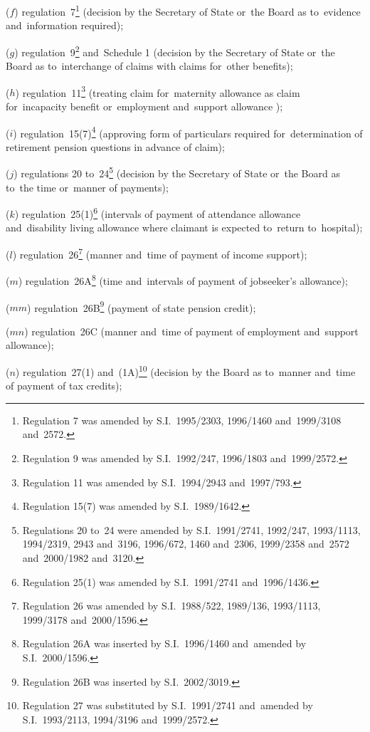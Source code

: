\documentclass[12pt,a4paper]{article}
\begin{document}
\begin{enumerate}
($f$) regulation~7\footnote{Regulation 7 was amended by S.I.~1995/2303, 1996/1460 and~1999/3108 and~2572.} (decision by the Secretary of State or~the Board as to~evidence and~information required);

($g$) regulation~9\footnote{Regulation 9 was amended by S.I.~1992/247, 1996/1803 and~1999/2572.} and~Schedule 1 (decision by the Secretary of State or~the Board as to~interchange of claims with claims for~other benefits);

($h$) regulation~11\footnote{Regulation 11 was amended by S.I.~1994/2943 and~1997/793.} (treating claim for~maternity allowance as claim for~incapacity benefit
or~employment and~support allowance%
);

($i$) regulation~15(7)\footnote{Regulation 15(7) was amended by S.I.~1989/1642.} (approving form of particulars required for~determination of retirement pension questions in advance of claim);

($j$) regulations 20 to~24\footnote{Regulations 20 to~24 were amended by S.I.~1991/2741, 1992/247, 1993/1113, 1994/2319, 2943 and~3196, 1996/672, 1460 and~2306, 1999/2358 and~2572 and~2000/1982 and~3120.} (decision by the Secretary of State or~the Board as to~the time or~manner of payments);

($k$) regulation~25(1)\footnote{Regulation 25(1) was amended by S.I.~1991/2741 and~1996/1436.} (intervals of payment of attendance allowance and~disability living allowance where claimant is expected to~return to~hospital);

($l$) regulation~26\footnote{Regulation 26 was amended by S.I.~1988/522, 1989/136, 1993/1113, 1999/3178 and~2000/1596.} (manner and~time of payment of income support);

($m$) regulation~26A\footnote{Regulation 26A was inserted by S.I.~1996/1460 and~amended by S.I.~2000/1596.} (time and~intervals of payment of jobseeker’s allowance);

($mm$) regulation~26B\footnote{Regulation 26B was inserted by S.I.~2002/3019.} (payment of state pension credit);

($mn$) regulation~26C (manner and~time of payment of employment and~support allowance);

($n$) regulation~27(1) and~(1A)\footnote{Regulation 27 was substituted by S.I.~1991/2741 and~amended by S.I.~1993/2113, 1994/3196 and~1999/2572.} (decision by the Board as to~manner and~time of payment of tax credits);


\end{enumerate}
\end{document}
